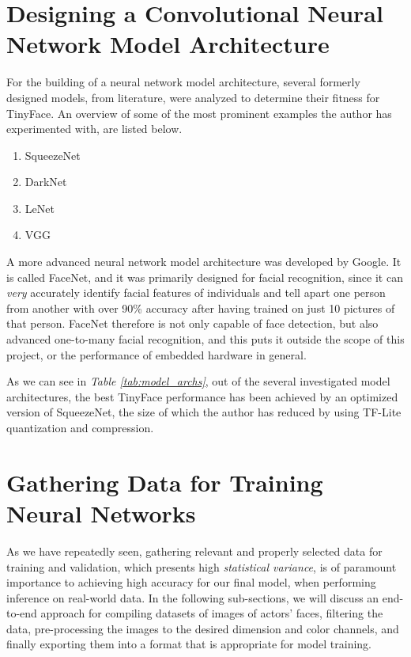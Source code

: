 \section{Designing a Convolutional Neural Network Model Architecture}
For the building of a neural network model architecture, several formerly designed models, from literature, were analyzed to determine their fitness for TinyFace. An overview of some of the most prominent examples the author has experimented with, are listed below.
\begin{enumerate}
    \item SqueezeNet \cite{squeezent_paper}
    \item DarkNet \cite{tiny_darknet}
    \item LeNet \cite{lenet_1}
    \item VGG \cite{vgg_paper}
\end{enumerate}
A more advanced neural network model architecture was developed by Google. It is called FaceNet, and it was primarily designed for facial recognition, since it can \textit{very} accurately identify facial features of individuals and tell apart one person from another with over 90\% accuracy after having trained on just 10 pictures of that person. FaceNet therefore is not only capable of face detection, but also advanced one-to-many facial recognition, and this puts it outside the scope of this project, or the performance of embedded hardware in general. \cite{facenetseminal_paper} \par
As we can see in \textit{Table \ref{tab:model_archs}}, out of the several investigated model architectures, the best TinyFace performance has been achieved by an optimized version of SqueezeNet, the size of which the author has reduced by using TF-Lite quantization and compression.


\section{Gathering Data for Training Neural Networks}
As we have repeatedly seen, gathering relevant and properly selected data for training and validation, which presents high \textit{statistical variance}, is of paramount importance to achieving high accuracy for our final model, when performing inference on real-world data.  In the following sub-sections, we will discuss an end-to-end approach for compiling datasets of images of actors' faces, filtering the data, pre-processing the images to the desired dimension and color channels, and finally exporting them into a format that is appropriate for model training.
